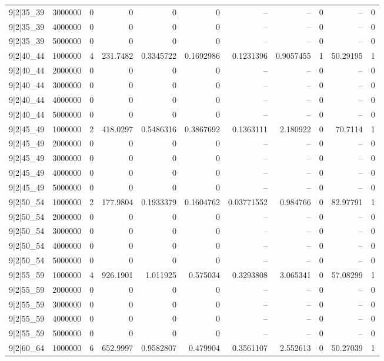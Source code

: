 \begin{tabular}{lrrrrrrrrrr}
9|2|35\_39 & 3000000 & 0 & 0 & 0 & 0 & -- & -- & 0 & -- & 0 \\
9|2|35\_39 & 4000000 & 0 & 0 & 0 & 0 & -- & -- & 0 & -- & 0 \\
9|2|35\_39 & 5000000 & 0 & 0 & 0 & 0 & -- & -- & 0 & -- & 0 \\
9|2|40\_44 & 1000000 & 4 & 231.7482 & 0.3345722 & 0.1692986 & 0.1231396 & 0.9057455 & 1 & 50.29195 & 1 \\
9|2|40\_44 & 2000000 & 0 & 0 & 0 & 0 & -- & -- & 0 & -- & 0 \\
9|2|40\_44 & 3000000 & 0 & 0 & 0 & 0 & -- & -- & 0 & -- & 0 \\
9|2|40\_44 & 4000000 & 0 & 0 & 0 & 0 & -- & -- & 0 & -- & 0 \\
9|2|40\_44 & 5000000 & 0 & 0 & 0 & 0 & -- & -- & 0 & -- & 0 \\
9|2|45\_49 & 1000000 & 2 & 418.0297 & 0.5486316 & 0.3867692 & 0.1363111 & 2.180922 & 0 & 70.7114 & 1 \\
9|2|45\_49 & 2000000 & 0 & 0 & 0 & 0 & -- & -- & 0 & -- & 0 \\
9|2|45\_49 & 3000000 & 0 & 0 & 0 & 0 & -- & -- & 0 & -- & 0 \\
9|2|45\_49 & 4000000 & 0 & 0 & 0 & 0 & -- & -- & 0 & -- & 0 \\
9|2|45\_49 & 5000000 & 0 & 0 & 0 & 0 & -- & -- & 0 & -- & 0 \\
9|2|50\_54 & 1000000 & 2 & 177.9804 & 0.1933379 & 0.1604762 & 0.03771552 & 0.984766 & 0 & 82.97791 & 1 \\
9|2|50\_54 & 2000000 & 0 & 0 & 0 & 0 & -- & -- & 0 & -- & 0 \\
9|2|50\_54 & 3000000 & 0 & 0 & 0 & 0 & -- & -- & 0 & -- & 0 \\
9|2|50\_54 & 4000000 & 0 & 0 & 0 & 0 & -- & -- & 0 & -- & 0 \\
9|2|50\_54 & 5000000 & 0 & 0 & 0 & 0 & -- & -- & 0 & -- & 0 \\
9|2|55\_59 & 1000000 & 4 & 926.1901 & 1.011925 & 0.575034 & 0.3293808 & 3.065341 & 0 & 57.08299 & 1 \\
9|2|55\_59 & 2000000 & 0 & 0 & 0 & 0 & -- & -- & 0 & -- & 0 \\
9|2|55\_59 & 3000000 & 0 & 0 & 0 & 0 & -- & -- & 0 & -- & 0 \\
9|2|55\_59 & 4000000 & 0 & 0 & 0 & 0 & -- & -- & 0 & -- & 0 \\
9|2|55\_59 & 5000000 & 0 & 0 & 0 & 0 & -- & -- & 0 & -- & 0 \\
9|2|60\_64 & 1000000 & 6 & 652.9997 & 0.9582807 & 0.479904 & 0.3561107 & 2.552613 & 0 & 50.27039 & 1 \\

\end{tabular}

